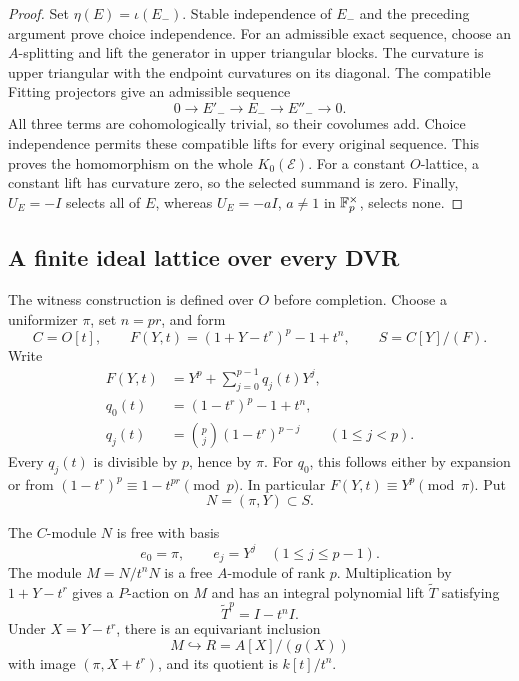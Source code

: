 \begin{proof}
Set \(\eta(E)=\iota(E_-)\).
Stable independence of \(E_-\) and the preceding argument prove
choice independence.  For an admissible exact sequence, choose
an \(A\)-splitting and lift the generator in upper triangular
blocks.  The curvature is upper triangular with the endpoint
curvatures on its diagonal.  The compatible Fitting projectors
give an admissible sequence
\[
 0\longrightarrow E'_-\longrightarrow E_-
       \longrightarrow E''_-\longrightarrow0.
\]
All three terms are cohomologically trivial, so their covolumes
add.  Choice independence permits these compatible lifts for
every original sequence.  This proves the homomorphism on the
whole \(K_0(\mathcal E)\).
For a constant \(O\)-lattice, a constant lift has curvature zero,
so the selected summand is zero.
Finally, \(U_E=-I\) selects all of \(E\), whereas
\(U_E=-aI\), \(a\ne1\) in \(\mathbb F_p^\times\), selects none.
\end{proof}

\subsection{A finite ideal lattice over every DVR}

The witness construction is defined over \(O\) before completion.
Choose a uniformizer \(\pi\), set \(n=pr\), and form
\[
 C=O[t],\qquad
 F(Y,t)=(1+Y-t^r)^p-1+t^n,\qquad
 S=C[Y]/(F).
\]
Write
\begin{equation}\label{eq:vertical-polynomial-coefficients}
 \begin{split}
 F(Y,t)&=Y^p+\sum_{j=0}^{p-1}q_j(t)Y^j,\\
 q_0(t)&=(1-t^r)^p-1+t^n,\\
 q_j(t)&=\binom pj(1-t^r)^{p-j}\qquad(1\le j<p).
 \end{split}
\end{equation}
Every \(q_j(t)\) is divisible by \(p\), hence by \(\pi\).
For \(q_0\), this follows either by expansion or from
\((1-t^r)^p\equiv1-t^{pr}\pmod p\).
In particular \(F(Y,t)\equiv Y^p\pmod\pi\).
Put
\[
 N=(\pi,Y)\subset S.
\]

\begin{lemma}\label{lem:vertical-ideal-lattice}
The \(C\)-module \(N\) is free with basis
\[
 e_0=\pi,\qquad e_j=Y^j\quad(1\le j\le p-1).
\]
The module \(M=N/t^nN\) is a free \(A\)-module of rank \(p\).
Multiplication by \(1+Y-t^r\) gives a \(P\)-action on \(M\)
and has an integral polynomial lift \(\widetilde T\) satisfying
\begin{equation}\label{eq:vertical-exact-curvature}
 \widetilde T^p=I-t^nI.
\end{equation}
Under \(X=Y-t^r\), there is an equivariant inclusion
\begin{equation}\label{eq:vertical-ideal-inclusion}
 M\hookrightarrow R=A[X]/(g(X))
\end{equation}
with image \((\pi,X+t^r)\), and its quotient is \(k[t]/t^n\).
\end{lemma}

